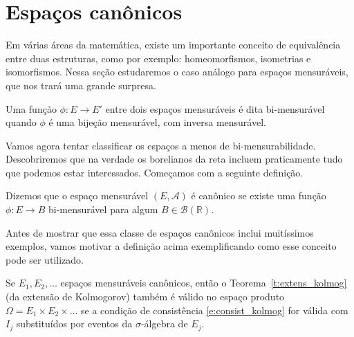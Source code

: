 \vfill
\pagebreak

\section{Espaços canônicos}

Em várias áreas da matemática, existe um importante conceito de equivalência entre duas estruturas, como por exemplo: homeomorfismos, isometrias e isomorfismos.
Nessa seção estudaremos o caso análogo para espaços mensuráveis, que nos trará uma grande surpresa.

\begin{definition}
  Uma função $\phi:E \to E'$ entre dois espaços mensuráveis é dita bi-mensurável  quando $\phi$ é uma bijeção mensurável, com inversa mensurável.
\end{definition}

Vamos agora tentar classificar os espaços a menos de bi-mensurabilidade.
Descobriremos que na verdade os borelianos da reta incluem praticamente tudo que podemos estar interessados.
Começamos com a seguinte definição.

\begin{definition}
  Dizemos que o espaço mensurável $(E, \mathcal{A})$ é canônico  se existe uma função $\phi: E \to B$ bi-mensurável para algum $B \in \mathcal{B}(\mathbb{R})$.
\end{definition}

Antes de mostrar que essa classe de espaços canônicos inclui muitíssimos exemplos, vamos motivar a definição acima exemplificando como esse conceito pode ser utilizado.

\begin{theorem}
  Se $E_1, E_2, \dots$ espaços mensuráveis canônicos, então o Teorema~\ref{t:extens_kolmog} (da extensão de Kolmogorov) também é válido no espaço produto $\Omega = E_1 \times E_2 \times \dots$ se a condição de consistência \eqref{e:consist_kolmog} for válida com $I_j$ substituídos por eventos da $\sigma$-álgebra de $E_j$.
\end{theorem}

